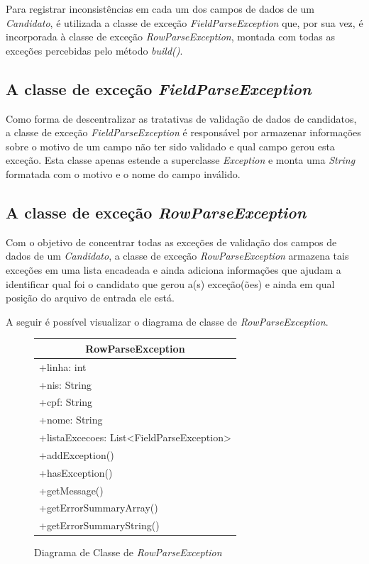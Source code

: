 \documentclass[
	12pt,			%
	openright,		%
	oneside,	
	a4paper,		%
	english,		%
	brazil			%
]{abntex2/abntex2}  %
\begin{document}
				Para registrar inconsistências em cada um dos campos de dados de um \textit{Candidato}, é utilizada a classe de exceção \textit{FieldParseException} que, por sua vez, é incorporada à classe de exceção \textit{RowParseException}, montada com todas as exceções percebidas pelo método \textit{build()}.

			\subsection{A classe de exceção \textit{FieldParseException}}
	
				Como forma de descentralizar as tratativas de validação de dados de candidatos, a classe de exceção \textit{FieldParseException} é responsável por armazenar informações sobre o motivo de um campo não ter sido validado e qual campo gerou esta exceção. Esta classe apenas estende a superclasse \textit{Exception} e monta uma \textit{String} formatada com o motivo e o nome do campo inválido.

			\subsection{A classe de exceção \textit{RowParseException}}	

				Com o objetivo de concentrar todas as exceções de validação dos campos de dados de um \textit{Candidato}, a classe de exceção \textit{RowParseException} armazena tais exceções em uma lista encadeada e ainda adiciona informações que ajudam a identificar qual foi o candidato que gerou a(s) exceção(ões) e ainda em qual posição do arquivo de entrada ele está.
	
				A seguir é possível visualizar o diagrama de classe de \textit{RowParseException}.
	
				\begin{figure}[ht]
					\begin{center}
						
						\caption{Diagrama de Classe de \textit{RowParseException}}
						\label{rowparseexception-uml}
			
						\begin{tabular}{|l|}
							\hline
							\multicolumn{1}{|c|}{\textbf{RowParseException}} \\ \hline
							+linha: int \\
							+nis: String \\
							+cpf: String \\
							+nome: String \\
							+listaExcecoes: List\textless{}FieldParseException\textgreater{} \\ \hline
							+addException() \\
							+hasException() \\
							+getMessage() \\
							+getErrorSummaryArray() \\
							+getErrorSummaryString() \\ \hline
						\end{tabular}
						
					\end{center}
				\end{figure}
\end{document}

